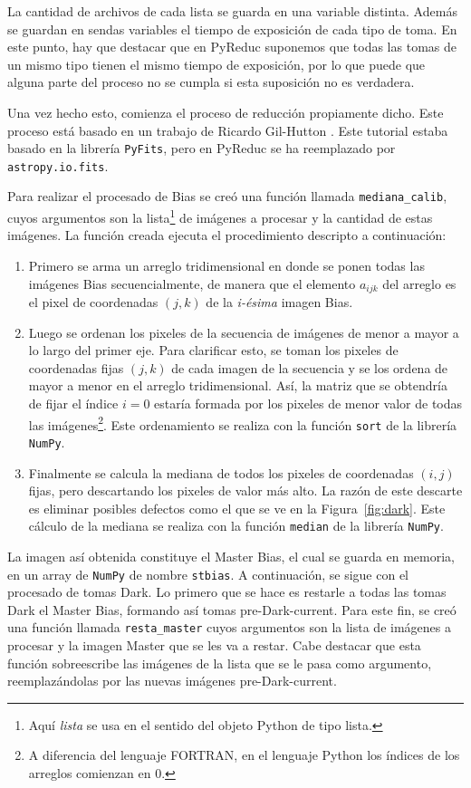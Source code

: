 \documentclass[a4paper, 12pt]{article}
\begin{document}
La cantidad de archivos de cada lista se guarda en una variable distinta. Además se guardan en sendas variables el tiempo de exposición de cada tipo de toma. En este punto, hay que destacar que en PyReduc suponemos que todas las tomas de un mismo tipo tienen el mismo tiempo de exposición, por lo que puede que alguna parte del proceso no se cumpla si esta suposición no es verdadera.

Una vez hecho esto, comienza el proceso de reducción propiamente dicho. Este proceso está basado en un trabajo de Ricardo Gil-Hutton \cite{gil-hutton}. Este tutorial estaba basado en la librería \texttt{PyFits},
pero en PyReduc se ha  reemplazado por {\tt astropy.io.fits}.


 Para realizar el procesado de Bias se creó una función llamada \texttt{mediana\_calib}, cuyos argumentos son la lista\footnote{Aquí {\it lista} se usa en el sentido del objeto Python de tipo lista.} de imágenes a procesar y la cantidad de estas imágenes. La función creada ejecuta el procedimiento descripto a continuación:
 \begin{enumerate}
 \item Primero se arma un arreglo tridimensional en donde se ponen todas las imágenes Bias secuencialmente, de manera que el elemento $a_{ijk}$ del arreglo es el pixel de coordenadas $(j,k)$ de la {\it i-ésima} imagen Bias.
 \item Luego se ordenan los pixeles de la secuencia de imágenes de menor a mayor a lo largo del primer eje. Para clarificar esto, se toman los pixeles de coordenadas fijas $(j,k)$ de cada imagen de la secuencia y se los ordena de mayor a menor en el arreglo tridimensional. Así, la matriz que se obtendría de fijar el índice $i=0$ estaría formada por los pixeles de menor valor de todas las imágenes\footnote{A diferencia del lenguaje FORTRAN, en el lenguaje Python los índices de los arreglos comienzan en 0.}. Este ordenamiento se realiza con la función \texttt{sort} de la librería \texttt{NumPy}.
 \item Finalmente se calcula la mediana de todos los pixeles de coordenadas $(i,j)$ fijas, pero descartando los pixeles de valor más alto. La razón de este descarte es eliminar posibles defectos como el que se ve en la Figura~\ref{fig:dark}. Este cálculo de la mediana se realiza con la función \texttt{median} de la librería \texttt{NumPy}.
 \end{enumerate}

 

 La imagen así obtenida constituye el Master Bias, el cual se guarda en memoria, en un array de \texttt{NumPy} de nombre \texttt{stbias}. A continuación, se sigue con el procesado de tomas Dark. Lo primero que se hace es restarle a todas las tomas Dark el Master Bias, formando así tomas pre-Dark-current. Para este fin, se creó una función llamada \texttt{resta\_master} cuyos argumentos son la lista de imágenes a procesar y la imagen Master que se les va a restar. Cabe destacar que esta función sobreescribe las imágenes de la lista que se le pasa como argumento, reemplazándolas por las nuevas imágenes pre-Dark-current.
\end{document}
